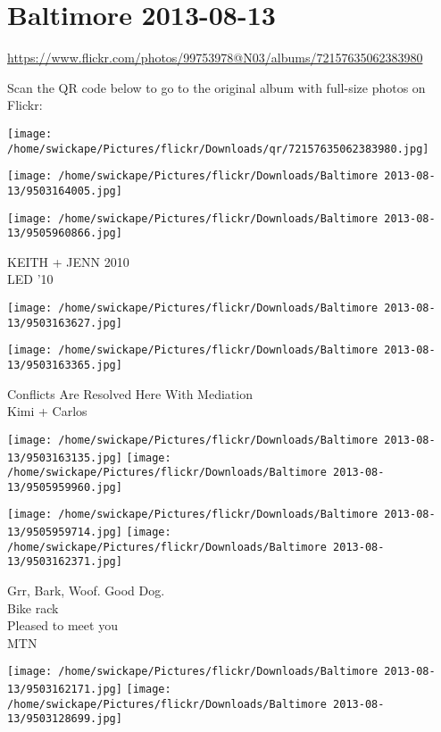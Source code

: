 \documentclass[10pt,letterpaper]{article}
\title{}
\author{}
\date{}
\begin{document}
\section*{Baltimore 2013-08-13}

\url{https://www.flickr.com/photos/99753978@N03/albums/72157635062383980}

Scan the QR code below to go to the original album with full-size photos on Flickr:

\texttt{[image: /home/swickape/Pictures/flickr/Downloads/qr/72157635062383980.jpg]}
\pagebreak

\texttt{[image: /home/swickape/Pictures/flickr/Downloads/Baltimore 2013-08-13/9503164005.jpg]}

\vspace{0.25in}
\texttt{[image: /home/swickape/Pictures/flickr/Downloads/Baltimore 2013-08-13/9505960866.jpg]}

KEITH + JENN 2010\\
LED '10
\pagebreak

\texttt{[image: /home/swickape/Pictures/flickr/Downloads/Baltimore 2013-08-13/9503163627.jpg]}

\vspace{0.25in}
\texttt{[image: /home/swickape/Pictures/flickr/Downloads/Baltimore 2013-08-13/9503163365.jpg]}

Conflicts Are Resolved Here With Mediation\\
Kimi + Carlos
\pagebreak

\texttt{[image: /home/swickape/Pictures/flickr/Downloads/Baltimore 2013-08-13/9503163135.jpg]}
\texttt{[image: /home/swickape/Pictures/flickr/Downloads/Baltimore 2013-08-13/9505959960.jpg]}

\texttt{[image: /home/swickape/Pictures/flickr/Downloads/Baltimore 2013-08-13/9505959714.jpg]}
\texttt{[image: /home/swickape/Pictures/flickr/Downloads/Baltimore 2013-08-13/9503162371.jpg]}

Grr, Bark, Woof.  Good Dog.\\
Bike rack\\
Pleased to meet you\\
MTN
\pagebreak

\texttt{[image: /home/swickape/Pictures/flickr/Downloads/Baltimore 2013-08-13/9503162171.jpg]}
\texttt{[image: /home/swickape/Pictures/flickr/Downloads/Baltimore 2013-08-13/9503128699.jpg]}
\end{document}
